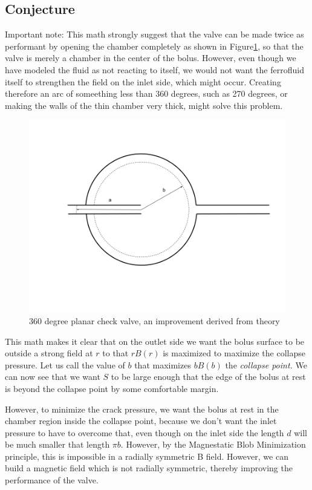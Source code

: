 \documentclass{asme2ej}
\begin{document}
\subsection{Conjecture}

Important note: This math strongly suggest that the valve can be
made twice as performant by opening the chamber completely as shown in Figure\ref{fig:360}, so that the
valve is merely a chamber in the center of the bolus.
However, even though we have modeled the fluid as not reacting to itself,
we would not want the ferrofluid itself
to strengthen the field on the inlet side, which might occur. Creating
therefore an arc of someething less than 360 degrees, such as 270 degrees,
or making the walls of the thin chamber very thick, might solve this problem.
\begin{figure}[H]
\centerline{\includegraphics[width=6in]{figure/360degreeplanarcheckvalve.png}}
\caption{360 degree planar check valve, an improvement derived from theory}
\label{fig:360}
\end{figure}
This math makes it clear that on the outlet side we want the
bolus surface to be outside a strong field at $r$ to that $r B(r)$ is
maximized to maximize the collapse pressure.
Let us call the value of $b$ that maximizes $b B(b)$ the {\em collapse point.}
We can now see that we want $S$ to be large enough that the edge
of the bolus at rest is beyond the collapse point by some
comfortable margin.

However, to minimize the crack pressure, we want the bolus at rest
in the chamber region inside
the collapse point, because we don't want the inlet pressure to have
to overcome that, even though on the inlet side the length $d$ will
be much smaller that length $\pi b$. However, by the
Magnestatic Blob Minimization principle, this is impossible in a
radially symmetric B field. However, we can build a magnetic field
which is not radially symmetric, thereby improving the performance of the valve.
\end{document}
